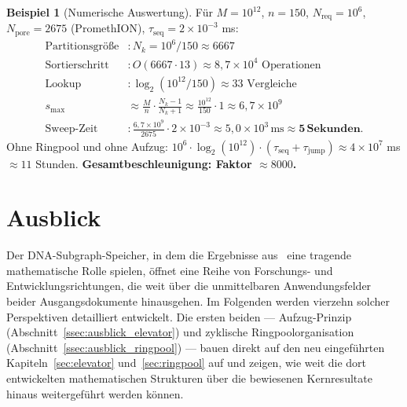 ﻿\documentclass[a4paper,12pt]{article}
\theoremstyle{definition}
\newtheorem{beispiel}{Beispiel}[section]
\theoremstyle{plain}
\begin{document}
\begin{beispiel}[Numerische Auswertung]
  Für $M = 10^{12}$, $n = 150$, $N_{\mathrm{req}} = 10^6$,
  $N_{\mathrm{pore}} = 2675$ (PromethION), $\tau_{\mathrm{seq}} = 2 \times 10^{-3}$ ms:
  \begin{align*}
    \text{Partitionsgröße} &: N_k = 10^6 / 150 \approx 6667 \\
    \text{Sortierschritt} &: O(6667 \cdot 13) \approx 8{,}7 \times 10^4
      \text{ Operationen} \\
    \text{Lookup} &: \log_2(10^{12}/150) \approx 33 \text{ Vergleiche} \\
    s_{\max} &\approx \frac{M}{n} \cdot \frac{N_k-1}{N_k+1}
      \approx \frac{10^{12}}{150} \cdot 1 \approx 6{,}7 \times 10^9 \\
    \text{Sweep-Zeit} &: \frac{6{,}7 \times 10^9}{2675} \cdot 2 \times 10^{-3}
      \approx 5{,}0 \times 10^3\,\text{ms} \approx \mathbf{5\,\text{Sekunden}}.
  \end{align*}
  Ohne Ringpool und ohne Aufzug: $10^6 \cdot \log_2(10^{12}) \cdot
  (\tau_{\mathrm{seq}} + \tau_{\mathrm{jump}}) \approx 4 \times 10^7$ ms
  $\approx 11$ Stunden.
  \textbf{Gesamtbeschleunigung: Faktor $\approx 8000$.}
\end{beispiel}

\section{Ausblick}
\label{sec:ausblick}

Der DNA-Subgraph-Speicher, in dem die Ergebnisse aus~\cite{dusgraph}
eine tragende mathematische Rolle spielen, öffnet eine Reihe von
Forschungs- und Entwicklungsrichtungen, die weit über die unmittelbaren
Anwendungsfelder beider Ausgangsdokumente hinausgehen.  Im Folgenden
werden vierzehn solcher Perspektiven detailliert entwickelt.  Die ersten
beiden --- Aufzug-Prinzip (Abschnitt~\ref{ssec:ausblick_elevator}) und
zyklische Ringpoolorganisation (Abschnitt~\ref{ssec:ausblick_ringpool})
--- bauen direkt auf den neu eingeführten Kapiteln~\ref{sec:elevator}
und~\ref{sec:ringpool} auf und zeigen, wie weit die dort entwickelten
mathematischen Strukturen über die bewiesenen Kernresultate hinaus
weitergeführt werden können.

\end{document}
